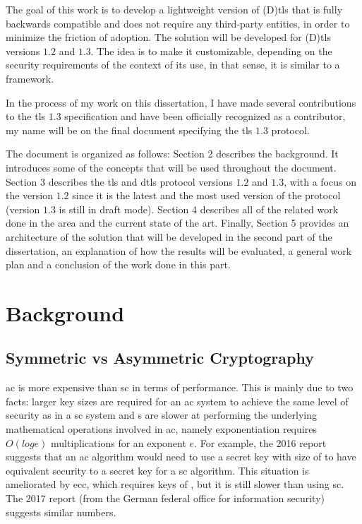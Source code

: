 \documentclass{llncs}
\begin{document}
{The goal of this work is to develop a lightweight version of (D)\gls{tls} that is
fully backwards compatible and does not require any third-party entities, in order
to minimize the friction of adoption. The solution will be developed for
(D)\gls{tls} versions $1.2$ and $1.3$. The idea is to make it customizable,
depending on the security requirements of the context of its use, in that sense, it is similar to a framework.

In the process of my work on this dissertation, I have made several
contributions to the \gls{tls} $1.3$ specification and have been officially
recognized as a contributor, my name will be on the final document specifying
the \gls{tls} $1.3$ protocol.

The document is organized as follows: Section 2 describes the background. It
introduces some of the concepts that will be used throughout
the document. Section 3 describes the \gls{tls} and \gls{dtls} protocol
versions $1.2$ and $1.3$, with a focus on the version $1.2$ since
it is the latest and the most used version of the protocol (version $1.3$ is still in
draft mode). Section 4 describes all of the related work done in the area and
the current state of the art. Finally, Section 5 provides an architecture of the
solution that will be developed in the second part of the dissertation,
an explanation of how the results will be evaluated, a general work plan
and a conclusion of the work done in this part.

\section{Background}

\subsection{Symmetric vs Asymmetric Cryptography}

\gls{ac} is more expensive than \gls{sc} in terms of performance. This is mainly due
to two facts: larger key sizes are required for an \gls{ac} system to achieve the
same level of security as in a \gls{sc} system  and s are slower at performing the underlying
mathematical operations involved in \gls{ac}, namely exponentiation requires
$O(log e)$ multiplications for an exponent $e$. For example,
the 2016  report \cite{Recommen44:online}
suggests that an \gls{ac} algorithm would need to use a secret key with size of 
to have equivalent security to a  secret key for a \gls{sc} algorithm.
This situation is ameliorated by \gls{ecc}, which requires keys of , but
it is still slower than using \gls{sc}. The 2017  report \cite{Kryptogr1:online} (from the
German federal office for information security) suggests similar numbers.

}
\end{document}
